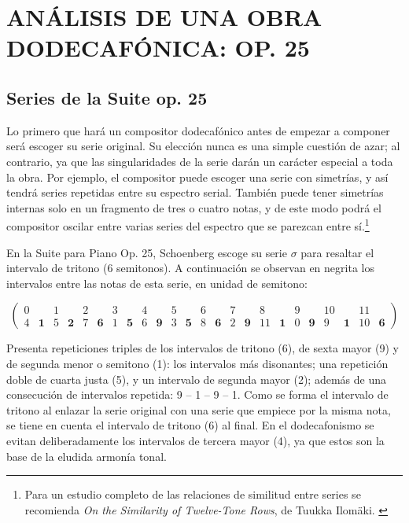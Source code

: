 \chapter{ANÁLISIS DE UNA OBRA DODECAFÓNICA: OP. 25}
\label{suitechapter}
	\section{Series de la Suite op. 25}
		Lo primero que hará un compositor dodecafónico antes de empezar a componer será escoger su serie original. Su elección nunca es una simple cuestión de azar; al contrario, ya que las singularidades de la serie darán un carácter especial a toda la obra. Por ejemplo, el compositor puede escoger una serie con simetrías, y así tendrá series repetidas entre su espectro serial. También puede tener simetrías internas solo en un fragmento de tres o cuatro notas, y de este modo podrá el compositor oscilar entre varias series del espectro que se parezcan entre sí.\footnote{Para un estudio completo de las relaciones de similitud entre series se recomienda \emph{On the Similarity of Twelve-Tone Rows}, de Tuukka Ilomäki. \cite{ilomaki}}
		
		En la Suite para Piano Op. 25, Schoenberg escoge su serie $\sigma$ para resaltar el intervalo de tritono (6 semitonos). A continuación se observan en negrita los intervalos entre las notas de esta serie, en unidad de semitono:
		
		\vspace{-0.5cm}
		\begin{footnotesize}	\[\left(\begin{matrix}0&&1&&2&&3&&4&&5&&6&&7&&8&&9&&10&&11&\\4&\mathbf{1}&5&\mathbf{2}&7&\mathbf{6}&1&\mathbf{5}&6&\mathbf{9}&3&\mathbf{5}&8&\mathbf{6}&2&\mathbf{9}&11&\mathbf{1}&0&\mathbf{9}&9&\mathbf{1}&10&\mathbf{6}\end{matrix}\right)\]		
		\end{footnotesize}\vspace{-0.5cm}
				
		Presenta repeticiones triples de los intervalos de tritono (6), de sexta mayor (9) y de segunda menor o semitono (1): los intervalos más disonantes; una repetición doble de cuarta justa (5), y un intervalo de segunda mayor (2); además de una consecución de intervalos repetida: 9 -- 1 -- 9 -- 1. Como se forma el intervalo de tritono al enlazar la serie original con una serie que empiece por la misma nota, se tiene en cuenta el intervalo de tritono (6) al final. En el dodecafonismo se evitan deliberadamente los intervalos de tercera mayor (4), ya que estos son la base de la eludida armonía tonal. \label{serie25}
		
